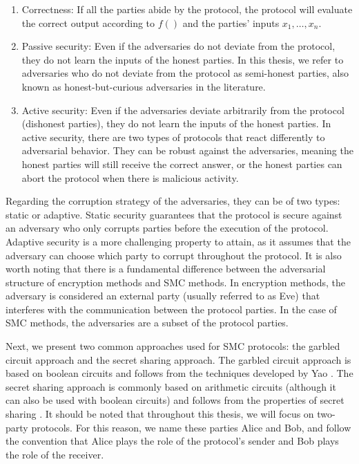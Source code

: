 \begin{enumerate}
\item Correctness: If all the parties abide by the protocol, the protocol will evaluate the correct output according to $f()$ and the parties' inputs $x_1, \ldots, x_n$.

\item Passive security: Even if the adversaries do not deviate from the protocol, they do not learn the inputs of the honest parties. In this thesis, we refer to adversaries who do not deviate from the protocol as semi-honest parties, also known as honest-but-curious adversaries in the literature.

\item Active security: Even if the adversaries deviate arbitrarily from the protocol (dishonest parties), they do not learn the inputs of the honest parties. In active security, there are two types of protocols that react differently to adversarial behavior. They can be robust against the adversaries, meaning the honest parties will still receive the correct answer, or the honest parties can abort the protocol when there is malicious activity.
\end{enumerate}

Regarding the corruption strategy of the adversaries, they can be of two types: static or adaptive. Static security guarantees that the protocol is secure against an adversary who only corrupts parties before the execution of the protocol. Adaptive security is a more challenging property to attain, as it assumes that the adversary can choose which party to corrupt throughout the protocol. It is also worth noting that there is a fundamental difference between the adversarial structure of encryption methods and SMC methods. In encryption methods, the adversary is considered an external party (usually referred to as Eve) that interferes with the communication between the protocol parties. In the case of SMC methods, the adversaries are a subset of the protocol parties.

Next, we present two common approaches used for SMC protocols: the garbled circuit approach and the secret sharing approach. The garbled circuit approach is based on boolean circuits and follows from the techniques developed by Yao \cite{Yao82}. The secret sharing approach is commonly based on arithmetic circuits (although it can also be used with boolean circuits) and follows from the properties of secret sharing \cite{BGW88, CCD88}. It should be noted that throughout this thesis, we will focus on two-party protocols. For this reason, we name these parties Alice and Bob, and follow the convention that Alice plays the role of the protocol's sender and Bob plays the role of the receiver.

